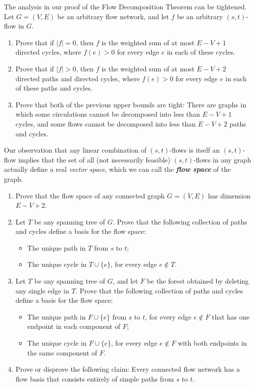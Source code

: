 \begin{exercises}
\item The analysis in our proof of the Flow Decomposition Theorem can be tightened.
Let $G = (V,E)$ be an arbitrary flow network, and let $f$ be an arbitrary $(s,t)$-flow in $G$.
\begin{enumerate}
\item Prove that if $|f| = 0$, then $f$ is the weighted sum of at most $E - V + 1$ directed cycles, where $f(e) > 0$ for every edge $e$ in each of these cycles.
\item Prove that if $|f| > 0$, then $f$ is the weighted sum of at most $E - V + 2$ directed paths and directed cycles, where $f(e) > 0$ for every edge $e$ in each of these paths and cycles.
\item Prove that both of the previous upper bounds are tight: There are graphs in which some circulations cannot be decomposed into less than $E - V + 1$ cycles, and some flows cannot be decomposed into less than $E - V + 2$ paths and cycles.
\end{enumerate}

\item {} Our observation that any linear combination of $(s,t)$-flows is itself an $(s,t)$-flow implies that the set of all (not necessarily feasible) $(s,t)$-flows in any graph actually define a real \textit{vector space}, which we can call the \textbf{\textit{flow space}} of the graph.
\begin{enumerate}
\item Prove that the flow space of any connected graph $G = (V,E)$ has dimension $E - V + 2$.
\item Let $T$ be any spanning tree of $G$.
Prove that the following collection of paths and cycles define a basis for the flow space:
\begin{itemize}
\item The unique path in $T$ from $s$ to $t$;
\item The unique cycle in $T \cup \{e\}$, for every edge $e \notin T$.
\end{itemize}
\item Let $T$ be any spanning tree of $G$, and let $F$ be the forest obtained by deleting any single edge in $T$.
Prove that the following collection of paths and cycles define a basis for the flow space:
\begin{itemize}
\item The unique path in $F \cup \{e\}$ from $s$ to $t$, for every edge $e \notin F$ that has one endpoint in each component of $F$;
\item The unique cycle in $F \cup \{e\}$, for every edge $e \notin F$ with both endpoints in the same component of $F$.
\end{itemize}
\item Prove or disprove the following claim: Every connected flow network has a flow basis that consists entirely of simple paths from $s$ to $t$.
\end{enumerate}


\end{exercises}
